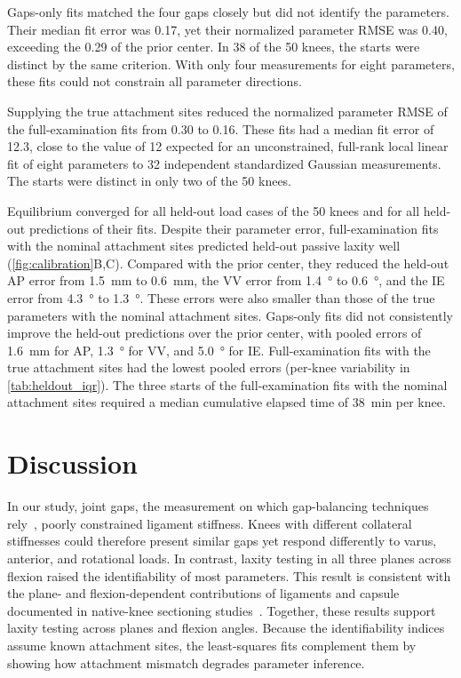 Gaps-only fits matched the four gaps closely but did not identify the parameters.
Their median fit error was 0.17, yet their normalized parameter RMSE was 0.40, exceeding the 0.29 of the prior center.
In 38 of the 50 knees, the starts were distinct by the same criterion.
With only four measurements for eight parameters, these fits could not constrain all parameter directions.

Supplying the true attachment sites reduced the normalized parameter RMSE of the full-examination fits from 0.30 to 0.16.
These fits had a median fit error of 12.3, close to the value of 12 expected for an unconstrained, full-rank local linear fit of eight parameters to 32 independent standardized Gaussian measurements.
The starts were distinct in only two of the 50 knees.

Equilibrium converged for all held-out load cases of the 50 knees and for all held-out predictions of their fits.
Despite their parameter error, full-examination fits with the nominal attachment sites predicted held-out passive laxity well (\autoref{fig:calibration}B,C).
Compared with the prior center, they reduced the held-out AP error from \SI{1.5}{\milli\meter} to \SI{0.6}{\milli\meter}, the VV error from \SI{1.4}{\degree} to \SI{0.6}{\degree}, and the IE error from \SI{4.3}{\degree} to \SI{1.3}{\degree}.
These errors were also smaller than those of the true parameters with the nominal attachment sites.
Gaps-only fits did not consistently improve the held-out predictions over the prior center, with pooled errors of \SI{1.6}{\milli\meter} for AP, \SI{1.3}{\degree} for VV, and \SI{5.0}{\degree} for IE.
Full-examination fits with the true attachment sites had the lowest pooled errors (per-knee variability in \autoref{tab:heldout_iqr}).
The three starts of the full-examination fits with the nominal attachment sites required a median cumulative elapsed time of \SI{38}{\minute} per knee.

\section{Discussion}

In our study, joint gaps, the measurement on which gap-balancing techniques rely~\autocite{sheth2017surgical}, poorly constrained ligament stiffness.
Knees with different collateral stiffnesses could therefore present similar gaps yet respond differently to varus, anterior, and rotational loads.
In contrast, laxity testing in all three planes across flexion raised the identifiability of most parameters.
This result is consistent with the plane- and flexion-dependent contributions of ligaments and capsule documented in native-knee sectioning studies~\autocite{markolf1976stiffness}.
Together, these results support laxity testing across planes and flexion angles.
Because the identifiability indices assume known attachment sites, the least-squares fits complement them by showing how attachment mismatch degrades parameter inference.

